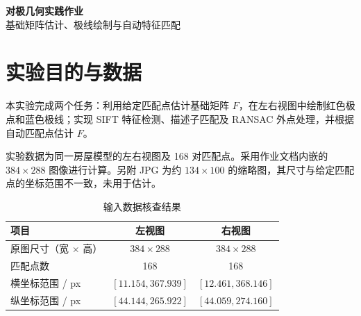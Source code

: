 \documentclass[UTF8,a4paper,zihao=-4,fontset=windows]{ctexart}
\begin{document}
\begin{center}
{\LARGE\bfseries 对极几何实践作业}\\[7pt]
{\large 基础矩阵估计、极线绘制与自动特征匹配}\\[5pt]
\end{center}
\vspace{3pt}

{}
\begin{abstract}
采用归一化八点法估计房屋模型双视图的基础矩阵，并计算极点、绘制极线。首先根据给定的 168 对匹配点求解基础矩阵，通过 SVD 施加秩 2 约束；随后采用 SIFT 特征提取、双向匹配筛选及 RANSAC 外点剔除，完成自动匹配与基础矩阵估计。给定匹配点的平均 Sampson 距离为 $\GivenMean\,\mathrm{px}^2$，左右平均点线距离约为 0.21 px。自动匹配经筛选获得 $\NumMutual$ 对点，RANSAC 保留 $\NumAutoInliers$ 对、剔除 $\NumAutoOutliers$ 对，最终内点集的平均 Sampson 距离为 $\AutoMean\,\mathrm{px}^2$。实验获得了两个任务对应的基础矩阵与极线结果。

\medskip
\noindent\textbf{关键词：}对极几何；基础矩阵；归一化八点法；SIFT；RANSAC
\end{abstract}

\setcounter{tocdepth}{2}
\begingroup
{}
\tableofcontents
\endgroup
\clearpage

\section{实验目的与数据}
本实验完成两个任务：利用给定匹配点估计基础矩阵 $F$，在左右视图中绘制红色极点和蓝色极线；实现 SIFT 特征检测、描述子匹配及 RANSAC 外点处理，并根据自动匹配点估计 $F$。

实验数据为同一房屋模型的左右视图及 168 对匹配点。采用作业文档内嵌的 $384\times288$ 图像进行计算。另附 JPG 为约 $134\times100$ 的缩略图，其尺寸与给定匹配点的坐标范围不一致，未用于估计。

\begin{table}[H]\centering\caption{输入数据核查结果}
\begin{tabular}{lcc}\toprule
项目 & 左视图 & 右视图\\\midrule
原图尺寸（宽 $\times$ 高） & $384\times288$ & $384\times288$\\
匹配点数 & 168 & 168\\
横坐标范围 / px & $[11.154,367.939]$ & $[12.461,368.146]$\\
纵坐标范围 / px & $[44.144,265.922]$ & $[44.059,274.160]$\\\bottomrule
\end{tabular}\end{table}
\end{document}
